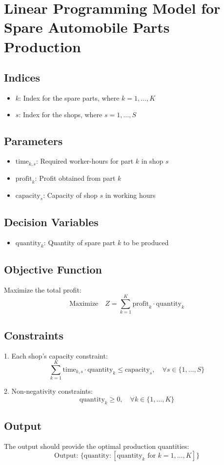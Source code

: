 \documentclass{article}
\begin{document}
\section*{Linear Programming Model for Spare Automobile Parts Production}

\subsection*{Indices}
\begin{itemize}
    \item \( k \): Index for the spare parts, where \( k = 1, \ldots, K \)
    \item \( s \): Index for the shops, where \( s = 1, \ldots, S \)
\end{itemize}

\subsection*{Parameters}
\begin{itemize}
    \item \( \text{time}_{k,s} \): Required worker-hours for part \( k \) in shop \( s \)
    \item \( \text{profit}_{k} \): Profit obtained from part \( k \)
    \item \( \text{capacity}_{s} \): Capacity of shop \( s \) in working hours
\end{itemize}

\subsection*{Decision Variables}
\begin{itemize}
    \item \( \text{quantity}_{k} \): Quantity of spare part \( k \) to be produced
\end{itemize}

\subsection*{Objective Function}
Maximize the total profit:
\[
\text{Maximize} \quad Z = \sum_{k=1}^{K} \text{profit}_{k} \cdot \text{quantity}_{k}
\]

\subsection*{Constraints}
1. Each shop's capacity constraint:
\[
\sum_{k=1}^{K} \text{time}_{k,s} \cdot \text{quantity}_{k} \leq \text{capacity}_{s}, \quad \forall s \in \{1, \ldots, S\}
\]

2. Non-negativity constraints:
\[
\text{quantity}_{k} \geq 0, \quad \forall k \in \{1, \ldots, K\}
\]

\subsection*{Output}
The output should provide the optimal production quantities:
\[
\text{Output: } \{ \text{quantity}: [\text{quantity}_{k} \text{ for } k = 1,\ldots,K] \}
\]
\end{document}
